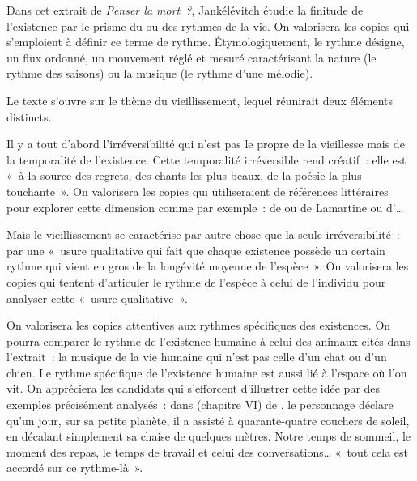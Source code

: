 		{Dans cet extrait de \emph{Penser la mort~?}, Jankélévitch étudie la finitude de
l'existence par le prisme du ou des rythmes de la vie. On valorisera les copies qui
s'emploient à définir ce terme de rythme. Étymologiquement, le rythme désigne, un
flux ordonné, un mouvement réglé et mesuré caractérisant la nature (le rythme des
saisons) ou la musique (le rythme d'une mélodie).

Le texte s'ouvre sur le thème du vieillissement, lequel réunirait deux éléments
distincts.

Il y a tout d'abord l'irréversibilité qui n'est pas le propre de la vieillesse mais de
la temporalité de l'existence. Cette temporalité irréversible rend créatif~: elle est «~à la
source des regrets, des chants les plus beaux, de la poésie la plus touchante~». On
valorisera les copies qui utiliseraient de références littéraires pour explorer cette
dimension comme par exemple~:  de  ou  de Lamartine ou  d'…

Mais le vieillissement se caractérise par autre chose que la seule irréversibilité~:
par une «~usure qualitative qui fait que chaque existence possède un certain rythme
qui vient en gros de la longévité moyenne de l'espèce~». On valorisera les copies qui
tentent d'articuler le rythme de l'espèce à celui de l'individu pour analyser cette «~usure
qualitative~».

On valorisera les copies attentives aux rythmes spécifiques des existences. On pourra
comparer le rythme de l'existence humaine à celui des animaux cités dans l'extrait~: la
musique de la vie humaine qui n'est pas celle d'un chat ou d'un chien. Le rythme
spécifique de l'existence humaine est aussi lié à l'espace où l'on vit. On appréciera les
candidats qui s'efforcent d'illustrer cette idée par des exemples précisément analysés~:
dans  (chapitre VI) de , le personnage déclare qu'un jour,
sur sa petite planète, il a assisté à quarante-quatre couchers de soleil, en décalant
simplement sa chaise de quelques mètres. Notre temps de sommeil, le moment des
repas, le temps de travail et celui des conversations… «~tout cela est accordé sur ce
rythme-là~».

}
